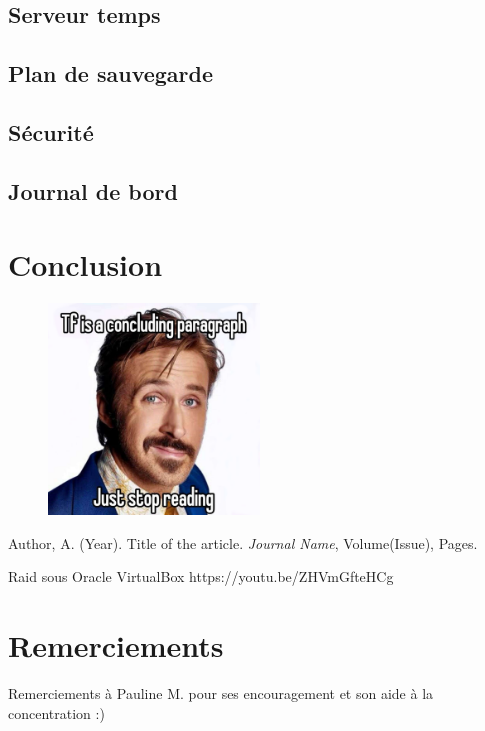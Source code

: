 \documentclass{article}
\begin{document}
\subsection{Serveur temps}
\subsection{Plan de sauvegarde}
\subsection{Sécurité}
\subsection{Journal de bord}

\pagebreak

	\newpage
	\section{Conclusion}


	\begin{figure}[h]
		\centering
		\includegraphics[width=0.5\textwidth]{gosling.png}
		
		\label{fig:gosling}
	\end{figure}
	

	\begin{thebibliography}{9}
		Author, A. (Year). Title of the article. \textit{Journal Name}, Volume(Issue), Pages.
		
		Raid sous Oracle VirtualBox 
		https://youtu.be/ZHVmGfteHCg
	\end{thebibliography}

	\section*{Remerciements}
	
	Remerciements à Pauline M. pour ses encouragement et son aide à la concentration :)
\end{document}
